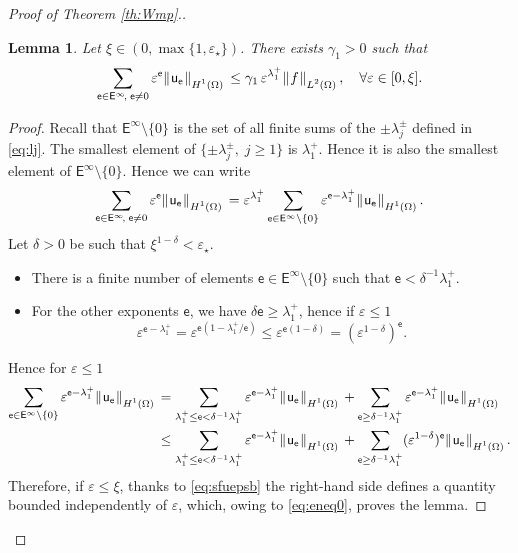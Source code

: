 \documentclass[titlepage,12pt]{amsart}
\newtheorem{lemma}[theorem]{Lemma}
\theoremstyle{definition}
\theoremstyle{remark}
\numberwithin{equation}{section}
\newcommand{\ee}{\hskip0.15ex}
\newcommand{\dd}[1]{_{\raise-0.6ex\hbox{$\scriptstyle #1$}}}
\newcommand {\DNorm}[2]{ \mathchoice
    {\|\ee #1\ee\|\dd{#2}\,}
    {\| #1 \|_{#2}}
    {\| #1 \|_{#2}}
    {\| #1 \|_{#2}} }
\newcommand{\sfe}{{\mathsf e}}
\newcommand{\sfE}{{\mathsf E}}
\newcommand{\sfu}{{\mathsf u}}
\begin{document}
\begin{proof}[Proof of Theorem \ref{th:Wmp}.]
\begin{lemma}
\label{lem:S1}
Let $\xi\in(0,\max\{1,\varepsilon_\star\})$. There exists $\gamma_1>0$ such that
\[
   \sum_{\sfe\in\sfE^\infty\!,\;\sfe\neq0} \varepsilon^{\sfe} \DNorm{\sfu_\sfe}{H^1(\Omega)}
   \le \gamma_1\, \varepsilon^{\lambda^+_1}
   {\DNorm{f}{L^2(\Omega)}},\quad\forall\varepsilon\in[0,\xi].
\]
\end{lemma}

\begin{proof}
Recall that $\sfE^\infty\setminus\{0\}$ is the set of all finite sums of the $\pm\lambda^\pm_j$ defined in \eqref{eq:lj}. The smallest element of $\{\pm\lambda^\pm_j,\;j\ge1\}$ is $\lambda^+_1$. Hence it is also the smallest element of $\sfE^\infty\setminus\{0\}$. Hence we can write
\begin{equation}
\label{eq:eneq0}
   \sum_{\sfe\in\sfE^\infty\!,\;\sfe\neq0} \varepsilon^{\sfe} \DNorm{\sfu_\sfe}{H^1(\Omega)} =
   \varepsilon^{\lambda^+_1} 
   \sum_{\sfe\in\sfE^\infty\setminus\{0\}} \varepsilon^{\sfe-\lambda^+_1} 
   \DNorm{\sfu_\sfe}{H^1(\Omega)}.
\end{equation}
Let $\delta>0$ be such that $\xi^{1-\delta}<\varepsilon_\star$. 
\begin{itemize}
\item There is a finite number of elements $\sfe\in\sfE^\infty\setminus\{0\}$ such that $\sfe<\delta^{-1}\lambda^+_1$.

\item For the other exponents $\sfe$, we have $\delta\sfe\ge \lambda^+_1$, hence if $\varepsilon\le1$
\[
   \varepsilon^{\sfe-\lambda^+_1} = 
   \varepsilon^{\sfe(1-\lambda^+_1/\sfe)} \le 
   \varepsilon^{\sfe(1-\delta)}=
   (\varepsilon^{1-\delta})^\sfe.
\]
\end{itemize}
Hence for $\varepsilon\le1$
\[
\begin{aligned}
   \sum_{\sfe\in\sfE^\infty\setminus\{0\}} \varepsilon^{\sfe-\lambda^+_1} 
   \DNorm{\sfu_\sfe}{H^1(\Omega)} &=
   \sum_{\lambda^+_1\le\sfe<\delta^{-1}\lambda^+_1}
   \varepsilon^{\sfe-\lambda^+_1} 
   \DNorm{\sfu_\sfe}{H^1(\Omega)} +
   \sum_{\sfe\ge\delta^{-1}\lambda^+_1}
   \varepsilon^{\sfe-\lambda^+_1} 
   \DNorm{\sfu_\sfe}{H^1(\Omega)} \\
&\le
   \sum_{\lambda^+_1\le\sfe<\delta^{-1}\lambda^+_1}
   \varepsilon^{\sfe-\lambda^+_1} 
   \DNorm{\sfu_\sfe}{H^1(\Omega)} +
   \sum_{\sfe\ge\delta^{-1}\lambda^+_1}
   (\varepsilon^{1-\delta})^\sfe 
   \DNorm{\sfu_\sfe}{H^1(\Omega)} .
\end{aligned}
\]
Therefore, if $\varepsilon\le\xi$, thanks to \eqref{eq:sfuepsb} the right-hand side defines a quantity bounded independently of $\varepsilon$, which, owing to \eqref{eq:eneq0}, proves the lemma.
\end{proof}


\end{proof}
\end{document}
